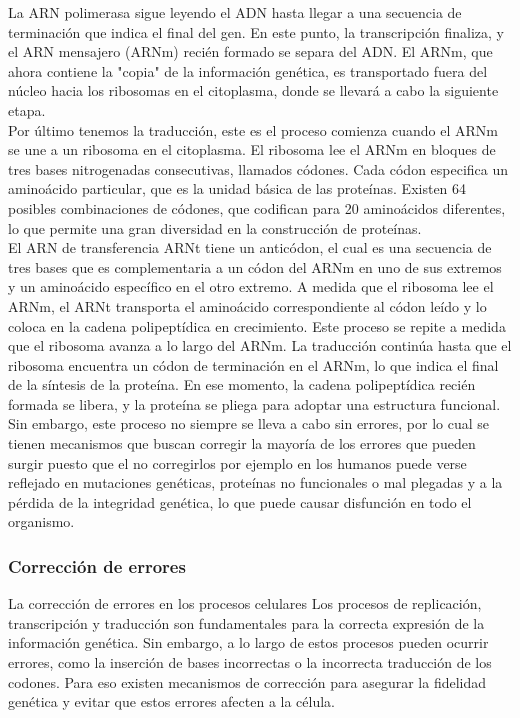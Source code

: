 La ARN polimerasa sigue leyendo el ADN hasta llegar a una secuencia de terminación que indica el final del gen. En este punto, la transcripción finaliza, y el ARN mensajero (ARNm) recién formado se separa del ADN. El ARNm, que ahora contiene la "copia" de la información genética, es transportado fuera del núcleo hacia los ribosomas en el citoplasma, donde se llevará a cabo la siguiente etapa.\\

Por último tenemos la traducción, este es el proceso  comienza cuando el ARNm se une a un ribosoma en el citoplasma. El ribosoma lee el ARNm en bloques de tres bases nitrogenadas consecutivas, llamados códones. Cada códon especifica un aminoácido particular, que es la unidad básica de las proteínas. Existen 64 posibles combinaciones de códones, que codifican para 20 aminoácidos diferentes, lo que permite una gran diversidad en la construcción de proteínas.\\

El ARN de transferencia ARNt  tiene un anticódon, el cual es una secuencia de tres bases que es complementaria a un códon del ARNm en uno de sus extremos y un aminoácido específico en el otro extremo. A medida que el ribosoma lee el ARNm, el ARNt transporta el aminoácido correspondiente al códon leído y lo coloca en la cadena polipeptídica en crecimiento. Este proceso se repite a medida que el ribosoma avanza a lo largo del ARNm. La traducción continúa hasta que el ribosoma encuentra un códon de terminación en el ARNm, lo que indica el final de la síntesis de la proteína. En ese momento, la cadena polipeptídica recién formada se libera, y la proteína se pliega para adoptar una estructura funcional.\\

Sin embargo, este proceso no siempre se lleva a cabo sin errores, por lo cual se tienen mecanismos que buscan corregir la mayoría de los errores que pueden surgir puesto que el no corregirlos por ejemplo en los humanos puede verse reflejado en mutaciones genéticas, proteínas no funcionales o mal plegadas y a la pérdida de la integridad genética, lo que puede causar disfunción en todo el organismo.\\

\subsubsection{Corrección de errores}

La corrección de errores en los procesos celulares
Los procesos de replicación, transcripción y traducción son fundamentales para la correcta expresión de la información genética. Sin embargo, a lo largo de estos procesos pueden ocurrir errores, como la inserción de bases incorrectas o la incorrecta traducción de los codones. Para eso existen mecanismos de corrección para asegurar la fidelidad genética y evitar que estos errores afecten a la célula.\\

